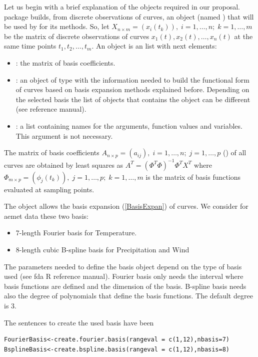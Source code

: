 Let us begin with a brief explanation of the  objects required in our proposal.  package builds, from discrete observations of curves, an  object (named ) that will be used by  for its methods. So, let $X_{n\times m}=(x_i(t_k)),\; i=1,\ldots,n;\; k=1,\ldots,m$ be the matrix of discrete observations of curves $x_{1}\left( t\right) ,x_{2}\left( t\right) ,\ldots ,x_{n}\left( t\right) $ at the same time points $t_{1},t_{2},\ldots ,t_{m}$. An  object is an  list with next elements:
\begin{itemize}
\item {}: the matrix of basis coefficients.
\item {}: an object of type  with the information needed to build the functional form of curves based on basis expansion methods explained before. Depending on the selected basis the list of objects that contains the  object can be different (see  reference manual).
\item {}: a list containing names for the arguments, function values and variables. This argument is not necessary.
\end{itemize}
The matrix of basis coefficients $A_{n \times p}=(a_{ij}), \; i=1,\ldots,n;\; j=1,\ldots,p$ () of all curves are obtained by least squares as $A^{T}=\left( \Phi ^{T}\Phi \right) ^{-1}\Phi ^{T}X^{T}$
where  $\Phi_{m \times p} = (\phi _{j}\left( t_{k}\right)),\; j=1,\ldots,p; \; k=1,\ldots,m$ is the matrix of basis functions evaluated at sampling points.

The  object allows the basis expansion (\ref{BasisExpan}) of curves. We consider for aemet data these two basis:
\begin{itemize}
 \item $7$-length Fourier basis for Temperature.
 \item $8$-length cubic B-spline basis for Precipitation and Wind
\end{itemize}
The  parameters needed to define the basis object depend on the type of basis used (see fda R reference manual). Fourier basis only needs the interval where basis functions are defined and the dimension of the basis. B-spline basis needs also the degree of polynomials that define the basis functions. The default degree is 3.

The sentences to create the used basis have been

\begin{verbatim}
FourierBasis<-create.fourier.basis(rangeval = c(1,12),nbasis=7)
BsplineBasis<-create.bspline.basis(rangeval = c(1,12),nbasis=8)
\end{verbatim}

